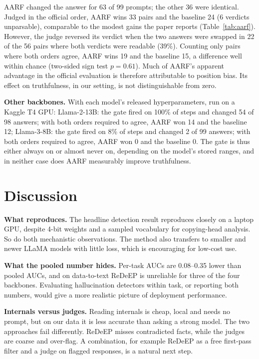 \documentclass[conference]{IEEEtran}
\begin{document}
AARF changed the answer for 63 of 99 prompts; the other 36 were identical. Judged in the official order, AARF wins 33 pairs and the baseline 24 (6 verdicts unparsable), comparable to the modest gains the paper reports (Table~\ref{tab:aarf}). However, the judge reversed its verdict when the two answers were swapped in 22 of the 56 pairs where both verdicts were readable (39\%). Counting only pairs where both orders agree, AARF wins 19 and the baseline 15, a difference well within chance (two-sided sign test $p=0.61$). Much of AARF's apparent advantage in the official evaluation is therefore attributable to position bias. Its effect on truthfulness, in our setting, is not distinguishable from zero.

\textbf{Other backbones.} With each model's released hyperparameters, run on a Kaggle T4 GPU: Llama-2-13B: the gate fired on 100\% of steps and changed 54 of 98 answers; with both orders required to agree, AARF won 14 and the baseline 12; Llama-3-8B: the gate fired on 8\% of steps and changed 2 of 99 answers; with both orders required to agree, AARF won 0 and the baseline 0. The gate is thus either always on or almost never on, depending on the model's stored ranges, and in neither case does AARF measurably improve truthfulness.

\section{Discussion}
\textbf{What reproduces.} The headline detection result reproduces closely on a laptop GPU, despite 4-bit weights and a sampled vocabulary for copying-head analysis. So do both mechanistic observations. The method also transfers to smaller and newer LLaMA models with little loss, which is encouraging for low-cost use.

\textbf{What the pooled number hides.} Per-task AUCs are 0.08--0.35 lower than pooled AUCs, and on data-to-text ReDeEP is unreliable for three of the four backbones. Evaluating hallucination detectors within task, or reporting both numbers, would give a more realistic picture of deployment performance.

\textbf{Internals versus judges.} Reading internals is cheap, local and needs no prompt, but on our data it is less accurate than asking a strong model. The two approaches fail differently. ReDeEP misses contradicted facts, while the judges are coarse and over-flag. A combination, for example ReDeEP as a free first-pass filter and a judge on flagged responses, is a natural next step.
\end{document}
